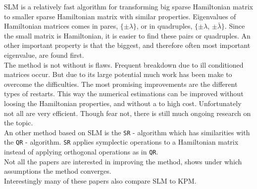 SLM is a relatively fast algorithm for transforming big sparse Hamiltonian matrix to smaller sparse Hamiltonian matrix with similar properties. Eigenvalues of Hamiltonian matrices comes in pares, $\{ \pm \lambda \} $, or in quadruples, $\{ \pm \lambda $, $\pm \bar{\lambda} \} $. Since the small matrix is Hamiltonian, it is easier to find these pairs or quadruples. An other important property is that the biggest, and therefore often most important eigenvalue, are found first.\\

The method is not without is flaws. Frequent breakdown due to ill conditioned matrices occur. But due to its large potential much work has been make to overcome the difficulties. The most promising improvements are the different types of restarts. This way the numerical estimations can be improved without loosing the Hamiltonian properties, and without a to high cost.
Unfortunately not all are very efficient. Though fear not, there is still much ongoing research on the topic. \\

An other method based on SLM is the \texttt{SR} - algorithm which has similarities with the \texttt{QR} - algorithm. \texttt{SR} applies symplectic operations to a Hamiltonian matrix instead of applying orthogonal operations as in \texttt{QR}. \\

Not all the papers are interested in improving the method, \cite{SLM4} shows under which assumptions the method converges. \\

Interestingly many of these papers also compare SLM to KPM.


